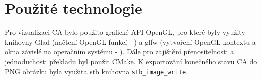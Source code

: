 \section{Použité technologie}
Pro vizualizaci CA bylo použito grafické API OpenGL, pro které byly
využity knihovny Glad (načtení OpenGL funkcí - \cite{GLAD}) a glfw (vytvoření OpenGL kontextu
a okna závislé na operačním systému - \cite{GLFW}).
Dále pro zajištění přenositelnosti a jednoduchosti překladu byl použit
CMake. K exportování konečného stavu CA do PNG obrázku byla využita stb knihovna
\verb|stb_image_write|.
